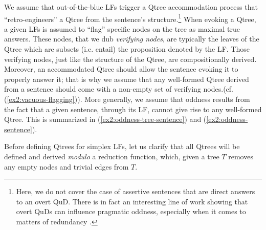 We assume that out-of-the-blue LFs trigger a Qtree accommodation process that ``retro-engineers'' a Qtree from the sentence's structure.\footnote{Here, we do not cover the case of assertive sentences that are direct answers to an overt QuD. There is in fact an interesting line of work showing that overt QuDs can influence pragmatic oddness, especially when it comes to matters of redundancy \citep{Haslinger2023}.} When evoking a Qtree, a given LFs is assumed to ``flag'' specific nodes on the tree as maximal true answers. These nodes, that we dub \textit{verifying nodes}, are typically the leaves of the Qtree which are subsets (i.e. entail) the proposition denoted by the LF. Those verifying nodes, just like the structure of the Qtree, are compositionally derived. Moreover, an accommodated Qtree should allow the sentence evoking it to properly answer it; that is why we assume that any well-formed Qtree derived from a sentence should come with a non-empty set of verifying nodes.(cf. (\ref{ex2:vacuous-flagging})). More generally, we assume that oddness results from the fact that a given sentence, through its LF, cannot give rise to any well-formed Qtree. This is summarized in (\ref{ex2:oddness-tree-sentence}) and (\ref{ex2:oddness-sentence}).

\begin{exe}
	\label{ex2:vacuous-flagging}
	\label{ex2:oddness-tree-sentence}
	\label{ex2:oddness-sentence}
\end{exe}

Before defining Qtrees for simplex LFs, let us clarify that all Qtrees will be defined and derived \textit{modulo} a reduction function, which, given a tree $T$ removes any empty nodes and trivial edges from $T$.

